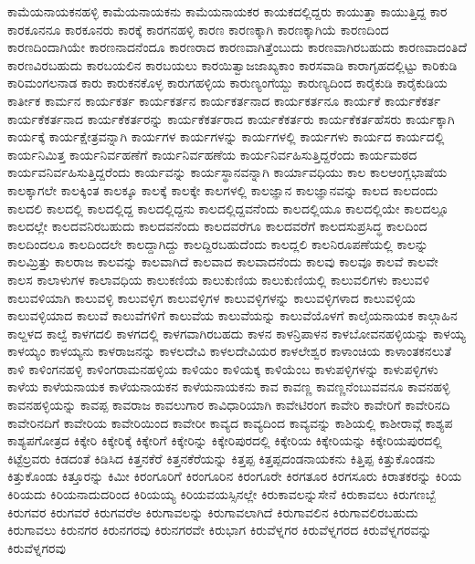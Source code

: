 {ಕಾಮೆಯನಾಯಕನಹಳ್ಳಿ
ಕಾಮೆಯನಾಯಕನು
ಕಾಮೆಯನಾಯಕರ
ಕಾಯಕದಲ್ಲಿದ್ದರು
ಕಾಯುತ್ತಾ
ಕಾಯುತ್ತಿದ್ದ
ಕಾರ
ಕಾರಕೂನನೂ
ಕಾರಕೂನರು
ಕಾರಕ್ಕೆ
ಕಾರಗನಹಳ್ಳಿ
ಕಾರಣ
ಕಾರಣಕ್ಕಾಗಿ
ಕಾರಣಕ್ಕಾಗಿಯೆ
ಕಾರಣದಿಂದ
ಕಾರಣದಿಂದಾಗಿಯೇ
ಕಾರಣನಾದನೆಂದೂ
ಕಾರಣರಾದ
ಕಾರಣವಾಗಿತ್ತೆಂಬುದು
ಕಾರಣವಾಗಿರಬಹುದು
ಕಾರಣವಾದಂತಿದೆ
ಕಾರಣವಿರಬಹುದು
ಕಾರಬಯಲಿನ
ಕಾರಬಯಲು
ಕಾರಯಿತ್ವಾಜಜಾಖ್ಯಕಾಂ
ಕಾರಸವಾಡಿ
ಕಾರಾಗೃಹದಲ್ಲಿಟ್ಟು
ಕಾರಿಕುಡಿ
ಕಾರಿಮಂಗಲನಾಡ
ಕಾರು
ಕಾರುಕನಕೊಳ್ಳ
ಕಾರುಗಹಳ್ಳಿಯ
ಕಾರುಣ್ಯಂಗೆಯ್ದು
ಕಾರುಣ್ಯದಿಂದ
ಕಾರೈಕುಡಿ
ಕಾರೈಕುಡಿಯ
ಕಾರ್ತೀಕ
ಕಾರ್ಮನ
ಕಾರ್ಯಕರ್ತ
ಕಾರ್ಯಕರ್ತನ
ಕಾರ್ಯಕರ್ತನಾದ
ಕಾರ್ಯಕರ್ತನೂ
ಕಾರ್ಯಕೆ
ಕಾರ್ಯಕೆಕರ್ತ
ಕಾರ್ಯಕೆಕರ್ತನಾದ
ಕಾರ್ಯಕೆಕರ್ತರನ್ನು
ಕಾರ್ಯಕೆಕರ್ತರಾದ
ಕಾರ್ಯಕೆಕರ್ತರು
ಕಾರ್ಯಕೆಕರ್ತಹೆಸರು
ಕಾರ್ಯಕ್ಕಾಗಿ
ಕಾರ್ಯಕ್ಕೆ
ಕಾರ್ಯಕ್ಷೇತ್ರವನ್ನಾಗಿ
ಕಾರ್ಯಗಳ
ಕಾರ್ಯಗಳನ್ನು
ಕಾರ್ಯಗಳಲ್ಲಿ
ಕಾರ್ಯಗಳು
ಕಾರ್ಯದ
ಕಾರ್ಯದಲ್ಲಿ
ಕಾರ್ಯನಿಮಿತ್ತ
ಕಾರ್ಯನಿರ್ವಹಣೆಗೆ
ಕಾರ್ಯನಿರ್ವಹಣೆಯ
ಕಾರ್ಯನಿರ್ವಹಿಸುತ್ತಿದ್ದರೆಂದು
ಕಾರ್ಯಮಠದ
ಕಾರ್ಯವನಿರ್ವಹಿಸುತ್ತಿದ್ದರೆಂದು
ಕಾರ್ಯವನ್ನು
ಕಾರ್ಯಸ್ಥಾನವನ್ನಾಗಿ
ಕಾರ್ಯಾವಧಿಯು
ಕಾಲ
ಕಾಲಆಂಗ್ಲಭಾಷೆಯ
ಕಾಲಕ್ಕಾಗಲೇ
ಕಾಲಕ್ಕಿಂತ
ಕಾಲಕ್ಕೂ
ಕಾಲಕ್ಕೆ
ಕಾಲಕ್ಕೇ
ಕಾಲಗಳಲ್ಲಿ
ಕಾಲಜ್ಞಾನ
ಕಾಲಜ್ಞಾನವನ್ನು
ಕಾಲದ
ಕಾಲದಂದು
ಕಾಲದಲಿ
ಕಾಲದಲ್ಲಿ
ಕಾಲದಲ್ಲಿದ್ದ
ಕಾಲದಲ್ಲಿದ್ದನು
ಕಾಲದಲ್ಲಿದ್ದವನೆಂದು
ಕಾಲದಲ್ಲಿಯೂ
ಕಾಲದಲ್ಲಿಯೇ
ಕಾಲದಲ್ಲೂ
ಕಾಲದಲ್ಲೇ
ಕಾಲದವನಿರಬಹುದು
ಕಾಲದವನೆಂದು
ಕಾಲದವರೆಗೂ
ಕಾಲದವರೆಗೆ
ಕಾಲದಸುಪ್ರಸಿದ್ಧ
ಕಾಲದಿಂದ
ಕಾಲದಿಂದಲೂ
ಕಾಲದಿಂದಲೇ
ಕಾಲದ್ದಾಗಿದ್ದು
ಕಾಲದ್ದಿರಬಹುದೆಂದು
ಕಾಲದ್ಲಲಿ
ಕಾಲನಿರೂಪಣೆಯಲ್ಲಿ
ಕಾಲನ್ನು
ಕಾಲಮ್ರಿತ್ತು
ಕಾಲರಾಜ
ಕಾಲವನ್ನು
ಕಾಲವಾಗಿದೆ
ಕಾಲವಾದ
ಕಾಲವಾದನೆಂದು
ಕಾಲವು
ಕಾಲವೂ
ಕಾಲವೆ
ಕಾಲವೇ
ಕಾಲಸ
ಕಾಲಾಳುಗಳ
ಕಾಲಾವಧಿಯ
ಕಾಲುಕಣಿಯ
ಕಾಲುಕುಣಿಯ
ಕಾಲುಕುಣಿಯಲ್ಲಿ
ಕಾಲುವಲಿಗಳು
ಕಾಲುವಳಿ
ಕಾಲುವಳಿಯಾಗಿ
ಕಾಲುವಳ್ಳಿ
ಕಾಲುವಳ್ಳಿಗ
ಕಾಲುವಳ್ಳಿಗಳ
ಕಾಲುವಳ್ಳಿಗಳನ್ನು
ಕಾಲುವಳ್ಳಿಗಳಾದ
ಕಾಲುವಳ್ಳಿಯ
ಕಾಲುವಳ್ಳಿಯಾದ
ಕಾಲುವೆ
ಕಾಲುವೆಗಳಿಗೆ
ಕಾಲುವೆಯ
ಕಾಲುವೆಯನ್ನು
ಕಾಲುವೆಯೊಳಗೆ
ಕಾಲೈಯನಾಯಕ
ಕಾಲ್ಗಾಹಿನ
ಕಾಲ್ದಳದ
ಕಾಲ್ವೆ
ಕಾಳಗದಲಿ
ಕಾಳಗದಲ್ಲಿ
ಕಾಳಗವಾಗಿರಬಹದು
ಕಾಳನ
ಕಾಳನ್ರಿಪಾಳನ
ಕಾಳಬೋವನಹಳ್ಳಿಯನ್ನು
ಕಾಳಯ್ಯ
ಕಾಳಯ್ಯಂ
ಕಾಳಯ್ಯನು
ಕಾಳರಾಜನನ್ನು
ಕಾಳಲದೇವಿ
ಕಾಳಲದೇವಿಯರ
ಕಾಳಲೇಶ್ವರ
ಕಾಳಾಂಚಿಯ
ಕಾಳಾಂತಕನಲುತೆ
ಕಾಳಿ
ಕಾಳಿಂಗನಹಳ್ಳಿ
ಕಾಳಿಂಗರಾಮನಹಳ್ಳಿಯ
ಕಾಳಿಯಂ
ಕಾಳಿಯಕ್ಕ
ಕಾಳಿಯೆಂಬ
ಕಾಳುಪಳ್ಳಿಗಳನ್ನು
ಕಾಳುಪಳ್ಳಿಗಳು
ಕಾಳೆಯ
ಕಾಳೆಯನಾಯಕ
ಕಾಳೆಯನಾಯಕನ
ಕಾಳೆಯನಾಯಕನು
ಕಾವ
ಕಾವಣ್ಣ
ಕಾವಣ್ಣನೆಂಬುವವನೂ
ಕಾವನಹಳ್ಳಿ
ಕಾವನಹಳ್ಳಿಯನ್ನು
ಕಾವಪ್ಪ
ಕಾವರಾಜ
ಕಾವಲುಗಾರ
ಕಾವಿಧಾರಿಯಾಗಿ
ಕಾವೇಟಿರಂಗ
ಕಾವೇರಿ
ಕಾವೇರಿಗೆ
ಕಾವೇರಿನದಿ
ಕಾವೇರಿನದಿಗೆ
ಕಾವೇರಿಯ
ಕಾವೇರಿಯಿಂದ
ಕಾವೇರೀ
ಕಾವ್ಯದ
ಕಾವ್ಯದಿಂದ
ಕಾವ್ಯವನ್ನು
ಕಾಶಿಯಲ್ಲಿ
ಕಾಶೀರಾವ್ಗೆ
ಕಾಶ್ಯಪ
ಕಾಶ್ಯಪಗೋತ್ರದ
ಕಿಕ್ಕೇರಿ
ಕಿಕ್ಕೇರಿಕ್ಕೆ
ಕಿಕ್ಕೇರಿಗೆ
ಕಿಕ್ಕೇರಿನ್ನು
ಕಿಕ್ಕೇರಿಪುರದಲ್ಲಿ
ಕಿಕ್ಕೇರಿಯ
ಕಿಕ್ಕೇರಿಯನ್ನು
ಕಿಕ್ಕೇರಿಯಪುರದಲ್ಲಿ
ಕಿಟ್ಟೆಲ್ರವರು
ಕಿಡದಂತೆ
ಕಿಡಿಸಿದ
ಕಿತ್ತನಕೆರೆ
ಕಿತ್ತನಕೆರೆಯನ್ನು
ಕಿತ್ತಪ್ಪ
ಕಿತ್ತಪ್ಪದಂಡನಾಯಕನು
ಕಿತ್ತಿಪ್ಪ
ಕಿತ್ತುಕೊಂಡನು
ಕಿತ್ತುಕೊಂಡು
ಕಿತ್ತೂರನ್ನು
ಕಿಮೀ
ಕಿರಂಗೂರಿಗೆ
ಕಿರಂಗೂರಿನ
ಕಿರಂಗೂರೇ
ಕಿರಗತೂರ
ಕಿರಗಸೂರು
ಕಿರಾತಕರನ್ನು
ಕಿರಿಯ
ಕಿರಿಯದು
ಕಿರಿಯನಾದುದರಿಂದ
ಕಿರಿಯಯ್ಯ
ಕಿರಿಯವಯಸ್ಸಿನಲ್ಲೇ
ಕಿರುಕಾವಲನ್ನುಸೇನೆ
ಕಿರುಕಾವಲು
ಕಿರುಗಣಬ್ಬೆ
ಕಿರುಗವರ
ಕಿರುಗವರೆ
ಕಿರುಗವರೆಅ
ಕಿರುಗಾವಲನ್ನು
ಕಿರುಗಾವಲಾಗಿದೆ
ಕಿರುಗಾವಲಿನ
ಕಿರುಗಾವಲಿರಬಹುದು
ಕಿರುಗಾವಲು
ಕಿರುನಗರ
ಕಿರುನಗರವು
ಕಿರುನಗರವೇ
ಕಿರುಭಾಗ
ಕಿರುವೆಳ್ನಗರ
ಕಿರುವೆಳ್ನಗರದ
ಕಿರುವೆಳ್ನಗರವನ್ನು
ಕಿರುವೆಳ್ನಗರವು
}
